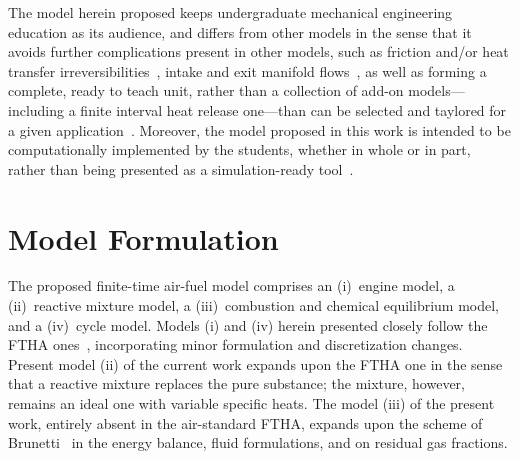     The model herein proposed keeps undergraduate mechanical engineering education as  its  audience,  and  differs  from  other
    models in the sense that it avoids further complications present in other models, such  as  friction  and/or  heat  transfer
    irreversibilities~\cite{2008-CurtoRissoPL+HernandezAC-JApplPhys, 2002-CatonJA-IntJMechEngEduc},  intake  and  exit  manifold
    flows~\cite{2001-CatonJA-IntJMechEngEduc}, as well as forming a complete, ready to teach unit, rather than a  collection  of
    add-on  models---including  a  finite  interval  heat  release  one---than  can  be  selected  and  taylored  for  a   given
    application~\cite{2013-MartinsJJG-Publindustria}.  Moreover,  the  model  proposed  in  this  work   is   intended   to   be
    computationally implemented by the students, whether in whole or in part, rather than being presented as a  simulation-ready
    tool~\cite{2011-ZuecoJ-IntJMechEngEduc}.



\section{Model Formulation}\label{sec:model}

    The proposed finite-time air-fuel model comprises an (i)~engine model, a (ii)~reactive mixture model, a (iii)~combustion and
    chemical equilibrium model, and a  (iv)~cycle  model.  Models  (i)  and  (iv)  herein  presented  closely  follow  the  FTHA
    ones~\cite{2017-NaaktgeborenC-IntJMechEngEduc}, incorporating minor formulation and discretization  changes.  Present  model
    (ii) of the current work expands upon the FTHA one in the sense that a reactive mixture replaces  the  pure  substance;  the
    mixture, however, remains an ideal one with variable specific heats. The model (iii) of the present work, entirely absent in
    the air-standard FTHA, expands upon the scheme  of  Brunetti~\cite{2012-BrunettiF-Blucher}  in  the  energy  balance,  fluid
    formulations, and on residual gas fractions.


